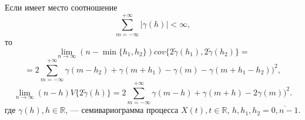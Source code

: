 \begin{Theorem}
	Если имеет место соотношение
	\begin{equation}
	\label{eq:var_abs}
		\sum_{m = -\infty}^{+\infty} \vert \gamma(h) \vert < \infty,
	\end{equation}
	то
	\begin{equation*}
		\lim_{n \to \infty} (n - \min\{ h_1, h_2 \}) cov\{ 2 \tilde{\gamma}(h_1), 2 \tilde{\gamma}(h_2) \} = %
	\end{equation*}
	\begin{equation}
	\label{eq:asymptotic_cov}
		= 2 \sum_{m = -\infty}^{+\infty} \gamma(m - h_2) + \gamma(m + h_1) - \gamma(m) - \gamma(m + h_1 - h_2))^2,
	\end{equation}
	\begin{equation}
	\label{eq:asymptotic_var}
		\lim_{n \to \infty} (n - h) V\{ 2 \tilde{\gamma}(h) \} = 2 \sum_{m = -\infty}^{+\infty} \gamma(m - h) + \gamma(m + h) - 2 \gamma(m))^2.
	\end{equation}
	где $ \gamma(h), h \in \mathbb{R} $, --- семивариограмма процесса $ X(t), t \in \mathbb{R}$, $ h, h_1, h_2 = \overline{0, n - 1} $.
\end{Theorem}
